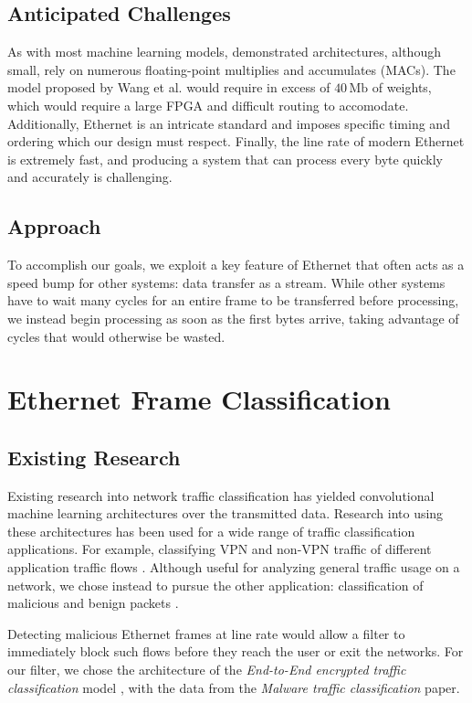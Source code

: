 \documentclass[conference]{IEEEtran}
\begin{document}
\subsection{Anticipated Challenges}
As with most machine learning models, demonstrated architectures, although small, rely on numerous floating-point multiplies and accumulates (MACs). The model proposed by Wang et al.\cite{paper-wang-conv1d} would require in excess of $40\,\text{Mb}$ of weights, which would require a large FPGA and difficult routing to accomodate. Additionally, Ethernet is an intricate standard and imposes specific timing and ordering which our design must respect. Finally, the line rate of modern Ethernet is extremely fast, and producing a system that can process every byte quickly and accurately is challenging.

\subsection{Approach}
To accomplish our goals, we exploit a key feature of Ethernet that often acts as a speed bump for other systems: data transfer as a stream. While other systems have to wait many cycles for an entire frame to be transferred before processing, we instead begin processing as soon as the first bytes arrive, taking advantage of cycles that would otherwise be wasted.

\section{Ethernet Frame Classification}

\subsection{Existing Research}
Existing research into network traffic classification
has yielded convolutional machine learning architectures
over the transmitted data.
Research into using these architectures has been used
for a wide range of traffic classification applications.
For example, classifying VPN and non-VPN traffic
of different application traffic flows \cite{paper-wang-conv1d}.
Although useful for analyzing general traffic usage on a network,
we chose instead to pursue the other application:
classification of malicious and benign packets \cite{paper-wang-malware}.

Detecting malicious Ethernet frames at line rate would
allow a filter to immediately block such flows before they reach the user
or exit the networks.
For our filter, we chose the architecture of the
\textit{End-to-End encrypted traffic classification}
model \cite{paper-wang-conv1d},
with the data from the
\textit{Malware traffic classification} paper\cite{paper-wang-malware}.
\end{document}
